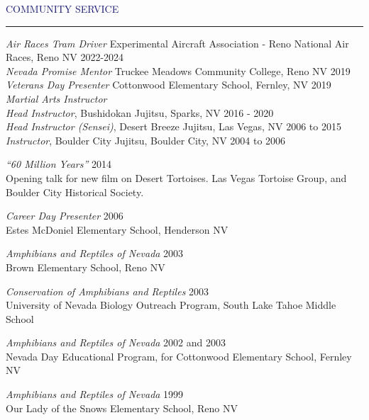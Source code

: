 \documentclass{resume} %
\renewenvironment{rSection}[1]{
\sectionskip
\textcolor{MidnightBlue}{\MakeUppercase{#1}}
\sectionlineskip
\hrule
\begin{list}{}{
\setlength{\leftmargin}{1.5em}
}
\item[]
}{
\end{list}
}
\begin{document}
\begin{rSection}{Community Service}
\textit{Air Races Tram Driver} Experimental Aircraft Association - Reno National Air Races, Reno NV \hfill 2022-2024 \\
\textit{Nevada Promise Mentor} Truckee Meadows Community College, Reno NV \hfill 2019 \\
\textit{Veterans Day Presenter} Cottonwood Elementary School, Fernley, NV \hfill 2019 \\
\textit{Martial Arts Instructor} \\
\textit{Head Instructor}, Bushidokan Jujitsu, Sparks, NV \hfill 2016 - 2020\\
\textit{Head Instructor (Sensei)}, Desert Breeze Jujitsu, Las Vegas, NV \hfill 2006 to 2015\\
\textit{Instructor}, Boulder City Jujitsu, Boulder City, NV \hfill 2004 to 2006

\textit{“60 Million Years”} \hfill 2014\\
Opening talk for new film on Desert Tortoises. Las Vegas Tortoise Group, and Boulder City Historical Society.

\textit{Career Day Presenter} \hfill 2006 \\
Estes McDoniel Elementary School, Henderson NV

\textit{Amphibians and Reptiles of Nevada} \hfill 2003 \\
Brown Elementary School, Reno NV 

\textit{Conservation of Amphibians and Reptiles} \hfill 2003 \\
University of Nevada Biology Outreach Program, South Lake Tahoe Middle School

\textit{Amphibians and Reptiles of Nevada} \hfill 2002 and 2003 \\
Nevada Day Educational Program, for Cottonwood Elementary School, Fernley NV

\textit{Amphibians and Reptiles of Nevada} \hfill 1999 \\
Our Lady of the Snows Elementary School, Reno NV\\

\end{rSection}
\end{document}
